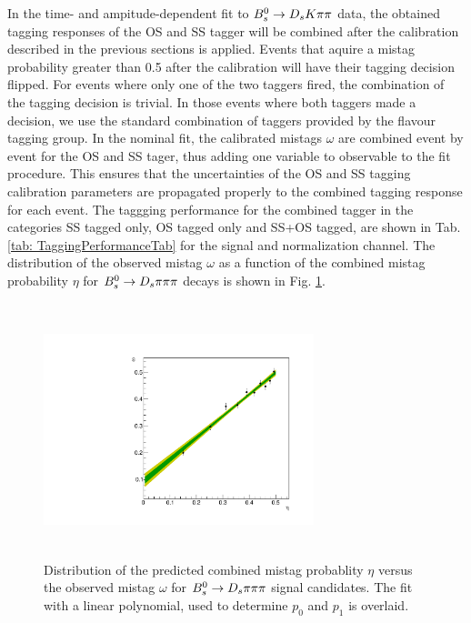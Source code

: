 In the time- and ampitude-dependent fit to ${{B}^0_{s}}\rightarrow{\ensuremath{{D}_{s}}}{\ensuremath{K}}{\ensuremath{\pi}}{\ensuremath{\pi}}$ data, the obtained tagging responses of the OS and SS tagger will be combined after the calibration described in the previous sections is applied.
Events that aquire a mistag probability greater than 0.5 after the calibration will have their tagging decision flipped. For events where only one of the two taggers fired, the combination of the tagging decision is trivial.
In those events where both taggers made a decision, we use the standard combination of taggers \cite{LHCb-PAPER-2011-027} provided by the flavour tagging group. 
In the nominal fit, the calibrated mistags $\omega$ are combined event by event for the OS and SS tager, thus adding one variable to observable to the fit procedure. 
This ensures that the uncertainties of the OS and SS tagging calibration parameters are propagated properly to the combined tagging response for each event. \newline
The taggging performance for the combined tagger in the categories SS tagged only, OS tagged only and SS+OS tagged, are shown in Tab. \ref{tab: TaggingPerformanceTab} for the signal and normalization channel.
The distribution of the observed mistag $\omega$ as a function of the combined mistag probability $\eta$ for ${{B}^0_{s}}\rightarrow{\ensuremath{{D}_{s}}}{\ensuremath{\pi}}{\ensuremath{\pi}}{\ensuremath{\pi}}$ decays is shown in Fig. \ref{fig:TaggingCombinationCalibration}.


\begin{figure}[h]
\centering
\includegraphics[height=7.4cm,width=0.7\textwidth]{figs/Tagging/TaggingCombinationCalibration.pdf}
\caption{Distribution of the predicted combined mistag probablity $\eta$ versus the observed mistag $\omega$ for ${{B}^0_{s}}\rightarrow{\ensuremath{{D}_{s}}}{\ensuremath{\pi}}{\ensuremath{\pi}}{\ensuremath{\pi}}$ signal candidates. 
The fit with a linear polynomial, used to determine $p_{0}$ and $p_{1}$ is overlaid.}
\label{fig:TaggingCombinationCalibration}
\end{figure}

